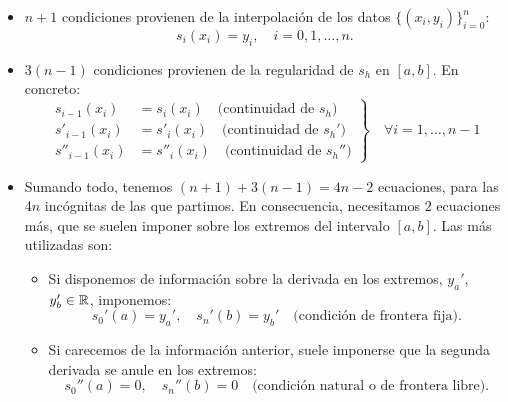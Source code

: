     \begin{itemize}
    \item $n+1$ condiciones provienen de la interpolación de los datos
      $\{(x_i, y_i)\}_{i=0}^n$:
      $$
      s_i(x_i)=y_i, \quad i=0,1,\dots,n.
      $$
    \item $3(n-1)$ condiciones provienen  de la regularidad de $s_h$ en
      $[a,b]$. En concreto:
      \begin{equation*}
        \left.
      \begin{aligned}
        s_{i-1}(x_i)&=s_{i}(x_i) \quad \text{(continuidad de $s_h$)}
        \\
        s'_{i-1}(x_i)&=s'_{i}(x_i) \quad \text{(continuidad de $s_h'$)}
        \\
        s''_{i-1}(x_i)&=s''_{i}(x_i) \quad \text{(continuidad de $s_h''$)}
      \end{aligned}
      \right\} \quad \forall i=1,\dots,n-1 
    \end{equation*}
    \item Sumando todo, tenemos $(n+1) + 3(n-1) = 4n-2$ ecuaciones, para
      las $4n$ incógnitas de las que partimos. En consecuencia,
      necesitamos $2$ ecuaciones más, que se suelen imponer sobre los
      extremos del intervalo $[a,b]$. Las más utilizadas son:
      \begin{itemize}
      \item Si disponemos de información sobre la derivada en los
        extremos, $y_a'$, $y_b'\in\operatorname{{\mathbb R}}$, imponemos:
        \begin{equation*}
          s_0'(a)=y_a', \quad s_n'(b)=y_b' \quad \text{(condición de frontera fija)}.
        \end{equation*}
      \item Si carecemos de la información anterior, suele imponerse que
        la segunda derivada se anule en los extremos:
        \begin{equation*}
          s_0''(a)=0, \quad s_n''(b)=0 \quad \text{(condición natural o de
            frontera libre)}.
        \end{equation*}
      \end{itemize}
    \end{itemize}

